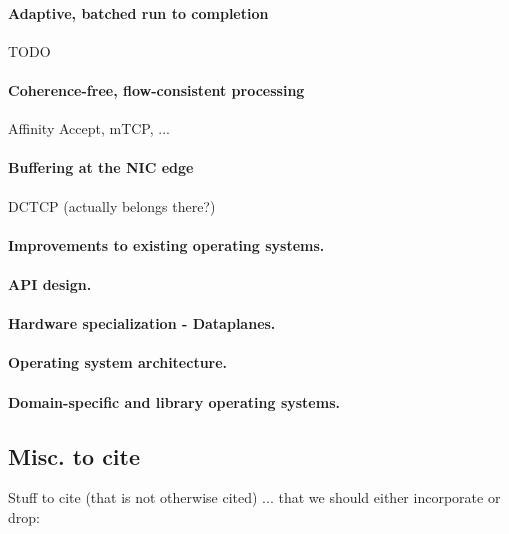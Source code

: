 \paragraph{Adaptive, batched run to completion}

\todo TODO

\paragraph{Coherence-free, flow-consistent processing}

\todo Affinity Accept, mTCP, ...

\paragraph{Buffering at the NIC edge}

\todo DCTCP (actually belongs there?)


\paragraph{Improvements to existing operating systems.}

\paragraph{API design.}


\paragraph{Hardware specialization - Dataplanes.}

\paragraph{Operating system architecture.}

\paragraph{Domain-specific and library operating systems.}

\subsection{Misc. to cite}

Stuff to cite (that is not otherwise cited) ... that we should either incorporate or drop:


